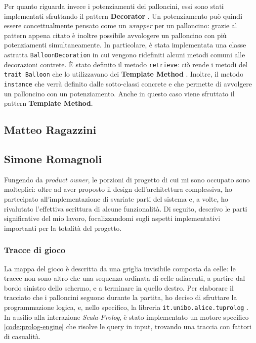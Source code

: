 

Per quanto riguarda invece i potenziamenti dei palloncini, essi sono stati implementati sfruttando il pattern
\textbf{Decorator} \cite{gof}. Un potenziamento può quindi essere concettualmente pensato come un \textit{wrapper} per un
palloncino: grazie al pattern appena citato è inoltre possibile avvologere un palloncino con più potenziamenti
simultaneamente. In particolare, è stata implementata una classe astratta \texttt{BalloonDecoration} in cui vengono
ridefiniti alcuni metodi comuni alle decorazioni contrete. È stato definito il metodo \texttt{retrieve}: ciò rende i
metodi del \texttt{trait Balloon} che lo utilizzavano dei \textbf{Template Method} \cite{gof}. Inoltre, il metodo
\texttt{instance} che verrà definito dalle sotto-classi concrete e che permette di avvolgere un palloncino con un
potenziamento. Anche in questo caso viene sfruttato il pattern \textbf{Template Method}.

\subsection{Matteo Ragazzini}

\subsection{Simone Romagnoli}
Fungendo da \textit{product owner}, le porzioni di progetto di cui mi sono occupato sono molteplici: oltre ad aver 
proposto il design dell'architettura complessiva, ho partecipato all'implementazione di svariate parti del sistema e, a 
volte, ho rivalutato l'effettiva scrittura di alcune funzionalità. Di seguito, descrivo le parti significative del mio 
lavoro, focalizzandomi sugli aspetti implementativi importanti per la totalità del progetto.

\subsubsection{Tracce di gioco}
La mappa del gioco è descritta da una griglia invisibile composta da celle: le tracce non sono altro
che una sequenza ordinata di celle adiacenti, a partire dal bordo sinistro dello schermo, e a terminare in quello
destro. Per elaborare il tracciato che i palloncini seguono durante la partita, ho deciso di sfruttare la programmazione
logica, e, nello specifico, la libreria \texttt{it.unibo.alice.tuprolog} \cite{TuProlog}. In ausilio alla interazione
\textit{Scala-Prolog}, è stato implementato un motore specifico \ref{code:prolog-engine} che risolve le query in input,
trovando una traccia con fattori di casualità.


